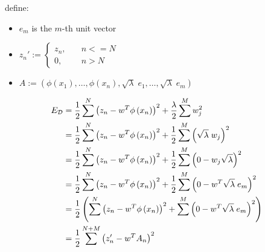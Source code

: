 
define:
\begin{itemize}
\item{$e_m$ is the $m$-th unit vector}
\item{$z_n' := \begin{cases}
  z_n, & \quad n <= N \\
  0,  & \quad n > N
\end{cases}$}
\item{$A := (\phi(x_1), \ldots, \phi(x_n), \sqrt{\lambda} \; e_1, \ldots, \sqrt{\lambda} \; e_m)$}
\end{itemize}

\begin{align*}
 E_{\mathcal{D}} &= \frac{1}{2} \sum\limits^N \left(z_n - w^T \phi\left(x_n\right)\right)^2 + \frac{\lambda}{2} \sum\limits^M w_j^2 \\
      &= \frac{1}{2} \sum\limits^N \left(z_n - w^T \phi\left(x_n\right)\right)^2 + \frac{1}{2} \sum\limits^M \left(\sqrt{\lambda} \; w_j\right)^2 \\
      &= \frac{1}{2} \sum\limits^N \left(z_n - w^T \phi\left(x_n\right)\right)^2 + \frac{1}{2} \sum\limits^M \left(0 - w_j \sqrt{\lambda}\right)^2 \\
      &= \frac{1}{2} \sum\limits^N \left(z_n - w^T \phi\left(x_n\right)\right)^2 + \frac{1}{2} \sum\limits^M \left(0 - w^T \sqrt{\lambda} \; e_m\right)^2 \\
      &= \frac{1}{2} \left(\sum\limits^N \left(z_n - w^T \phi\left(x_n\right)\right)^2 + \sum\limits^M \left(0 - w^T \sqrt{\lambda} \; e_m\right)^2\right) \\
      &= \frac{1}{2} \sum\limits^{N+M} \left(z_n' - w^T A_n\right)^2
\end{align*}



